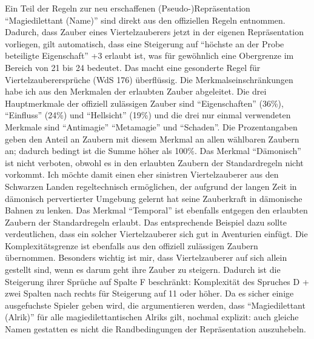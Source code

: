 Ein Teil der Regeln zur neu erschaffenen (Pseudo-)Repräsentation \enquote{Magiedilettant (Name)} sind direkt aus den offiziellen Regeln entnommen. Dadurch, dass Zauber eines Viertelzauberers jetzt in der eigenen Repräsentation vorliegen, gilt automatisch, dass eine Steigerung auf \enquote{höchste an der Probe beteiligte Eigenschaft} +3 erlaubt ist, was für gewöhnlich eine Obergrenze im Bereich von 21 bis 24 bedeutet. Das macht eine gesonderte Regel für Viertelzauberersprüche (WdS 176) überflüssig. Die Merkmalseinschränkungen habe ich aus den Merkmalen der erlaubten Zauber abgeleitet. Die drei Hauptmerkmale der offiziell zulässigen Zauber sind \enquote{Eigenschaften} (36\%), \enquote{Einfluss} (24\%) und \enquote{Hellsicht} (19\%) und die drei nur einmal verwendeten Merkmale sind \enquote{Antimagie} \enquote{Metamagie} und \enquote{Schaden}. Die Prozentangaben geben den Anteil an Zaubern mit diesem Merkmal an allen wählbaren Zaubern an; dadurch bedingt ist die Summe höher als 100\%. Das Merkmal \enquote{Dämonisch} ist nicht verboten, obwohl es in den erlaubten Zaubern der Standardregeln nicht vorkommt. Ich möchte damit einen eher sinistren Viertelzauberer aus den Schwarzen Landen regeltechnisch ermöglichen, der aufgrund der langen Zeit in dämonisch pervertierter Umgebung gelernt hat seine Zauberkraft in dämonische Bahnen zu lenken. Das Merkmal \enquote{Temporal} ist ebenfalls entgegen den erlaubten Zaubern der Standardregeln erlaubt. Das entsprechende Beispiel dazu sollte verdeutlichen, dass ein solcher Viertelzauberer sich gut in Aventurien einfügt. Die Komplexitätsgrenze ist ebenfalls aus den offiziell zulässigen Zaubern übernommen. Besonders wichtig ist mir, dass Viertelzauberer auf sich allein gestellt sind, wenn es darum geht ihre Zauber zu steigern. Dadurch ist die Steigerung ihrer Sprüche auf Spalte F beschränkt: Komplexität des Spruches D + zwei Spalten nach rechts für Steigerung auf 11 oder höher. Da es sicher einige ausgefuchste Spieler geben wird, die argumentieren werden, dass \enquote{Magiedilettant (Alrik)} für alle magiedilettantischen Alriks gilt, nochmal explizit: auch gleiche Namen gestatten es nicht die Randbedingungen der Repräsentation auszuhebeln.

